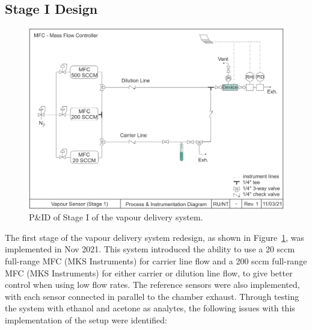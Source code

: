 \documentclass[
  a4paper,
]{scrbook}
\begin{document}
\hypertarget{sec-vapour-system-design-1}{%
\subsection{Stage I Design}\label{sec-vapour-system-design-1}}

\begin{figure}

{\centering \includegraphics[width=1\textwidth,height=\textheight]{figures/ch8/PID_V1.png}

}

\caption[P\&ID of Stage I of the vapour delivery
system.]{\label{fig-stage-1-pid}P\&ID of Stage I of the vapour delivery
system.}

\end{figure}

The first stage of the vapour delivery system redesign, as shown in
Figure~\ref{fig-stage-1-pid}, was implemented in Nov 2021. This system
introduced the ability to use a 20 sccm full-range MFC (MKS Instruments)
for carrier line flow and a 200 sccm full-range MFC (MKS Instruments)
for either carrier or dilution line flow, to give better control when
using low flow rates. The reference sensors were also implemented, with
each sensor connected in parallel to the chamber exhaust. Through
testing the system with ethanol and acetone as analytes, the following
issues with this implementation of the setup were identified:
\end{document}
